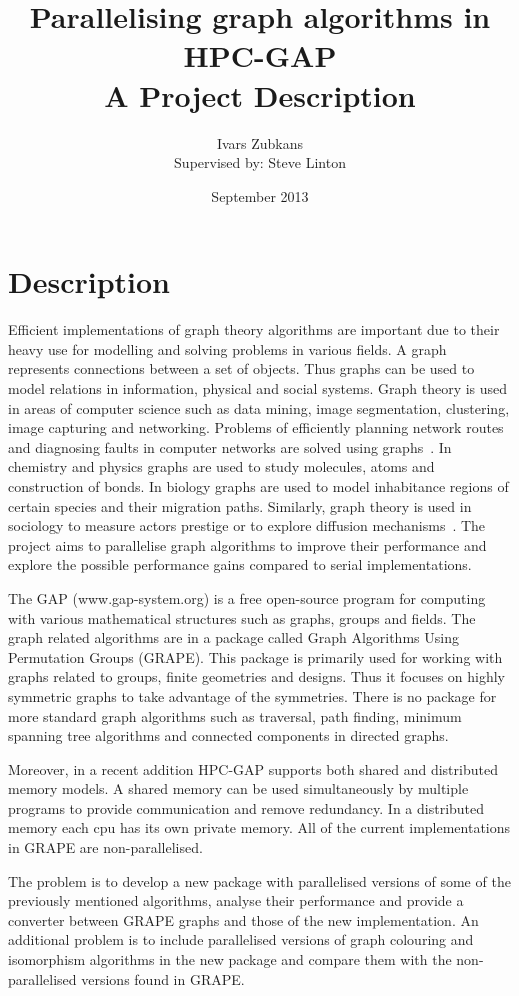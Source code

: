 \documentclass{article}
\title{Parallelising graph algorithms in HPC-GAP \\ \vspace{2 mm} {\large A Project Description}}
\author{Ivars Zubkans \\ \small Supervised by: Steve Linton}
\date{September 2013}
\begin{document}
\maketitle
\section{Description}
Efficient implementations of graph theory algorithms are important due to their heavy use for modelling and solving problems in various fields. A graph represents connections between a set of objects. Thus graphs can be used to model relations in information, physical and social systems. Graph theory is used in areas of computer science such as data mining, image segmentation, clustering, image capturing and networking. Problems of efficiently planning network routes and diagnosing faults in computer networks are solved using graphs~\cite{6005872}. In chemistry and physics graphs are used to study molecules, atoms and construction of bonds. In biology graphs are used to model inhabitance regions of certain species and their migration paths. Similarly, graph theory is used in sociology to measure actors prestige or to explore diffusion mechanisms~\cite{shirinivas2010applications}. The project aims to parallelise graph algorithms to improve their performance and explore the possible performance gains compared to serial implementations.

The GAP (www.gap-system.org) is a free open-source program for computing with various mathematical structures such as graphs, groups and fields. The graph related algorithms are in a package called Graph Algorithms Using Permutation Groups (GRAPE). This package is primarily used for working with graphs related to groups, finite geometries and designs. Thus it focuses on highly symmetric graphs to take advantage of the symmetries. There is no package for more standard graph algorithms such as traversal, path finding, minimum spanning tree algorithms and connected components in directed graphs.

Moreover, in a recent addition HPC-GAP supports both shared and distributed memory models. A shared memory can be used simultaneously by multiple programs to provide communication and remove redundancy. In a distributed memory each cpu has its own private memory. All of the current implementations in GRAPE are non-parallelised.

The problem is to develop a new package with parallelised versions of some of the previously mentioned algorithms, analyse their performance and provide a converter between GRAPE graphs and those of the new implementation. An additional problem is to include parallelised versions of graph colouring and isomorphism algorithms in the new package and compare them with the non-parallelised versions found in GRAPE.
\end{document}
